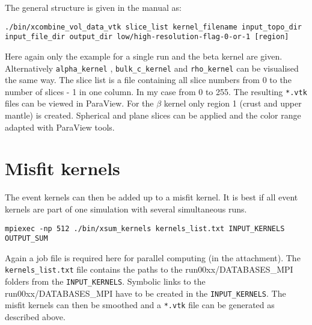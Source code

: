 The general structure is given in the manual as:
\begin{lstlisting} 
./bin/xcombine_vol_data_vtk slice_list kernel_filename input_topo_dir input_file_dir output_dir low/high-resolution-flag-0-or-1 [region]
\end{lstlisting}

Here again only the example for a single run and the beta kernel are given. 
Alternatively \texttt{alpha\_kernel} , \texttt{bulk\_c\_kernel} and \texttt{rho\_kernel} can be visualised the same way.
The slice list is a file containing all slice numbers from 0 to the 
number of slices - 1 in one column. In my case from 0 to 255.
The resulting \texttt{*.vtk} files can be viewed in ParaView.
For the $\beta$ kernel only region 1 (crust and upper mantle) is created.
Spherical and plane slices can be applied and the color range adapted 
with ParaView tools.

\section{Misfit kernels}

The event kernels can then be added up to a misfit kernel.
It is best if all event kernels are part of one simulation with
several simultaneous runs.

\begin{lstlisting} 
mpiexec -np 512 ./bin/xsum_kernels kernels_list.txt INPUT_KERNELS OUTPUT_SUM
\end{lstlisting}

Again a job file is required here for parallel computing (in the attachment).
The \texttt{kernels\_list.txt} file contains the paths to the {run00xx/DATABASES\_MPI} folders from the \texttt{INPUT\_KERNELS}.
Symbolic links to the {run00xx/DATABASES\_MPI} have to be created in the
\texttt{INPUT\_KERNELS}.
The misfit kernels can then be smoothed and a \texttt{*.vtk} file can be 
generated as described above.
